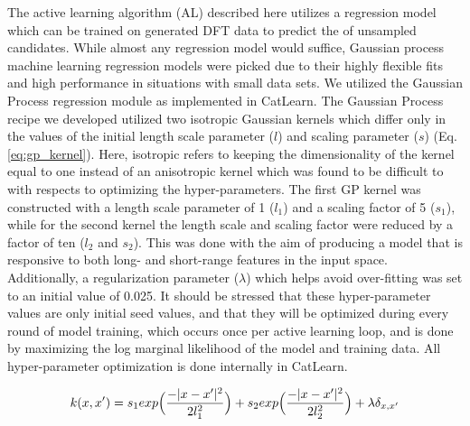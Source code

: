 %
The active learning algorithm (AL) described here utilizes a regression model which can be trained on generated DFT data to predict the \DHf of unsampled candidates.
%
While almost any regression model would suffice, Gaussian process machine learning regression models were picked due to their highly flexible fits and high performance in situations with small data sets.
%
We utilized the Gaussian Process regression module as implemented in CatLearn.\cite{hansen2019atomistic}
%
The Gaussian Process recipe we developed utilized two isotropic Gaussian kernels which differ only in the values of the initial length scale parameter ($l$) and scaling parameter ($s$) (Eq. \ref{eq:gp_kernel}).
%
Here, isotropic refers to keeping the dimensionality of the kernel equal to one instead of an anisotropic kernel which was found to be difficult to with respects to optimizing the hyper-parameters.
%
The first GP kernel was constructed with a length scale parameter of \num{1} ($l_1$) and a scaling factor of 5 ($s_1$),
while for the second kernel the length scale and scaling factor were reduced by a factor of ten ($l_2$ and $s_2$).
%
This was done with the aim of producing a model that is responsive to both long- and short-range features in the input space.
%
Additionally, a regularization parameter ($\lambda$) which helps avoid over-fitting was set to an initial value of \num{0.025}.
%
It should be stressed that these hyper-parameter values are only initial seed values, and that they will be optimized during every round of model training,
which occurs once per active learning loop,
and is done by maximizing the log marginal likelihood of the model and training data.
%
All hyper-parameter optimization is done internally in CatLearn.


\begin{equation}
    k(x,x') =
    s_1 exp \Bigl ( \frac{-|x-x'|^2}{2l_1^2}\Bigr) +
    s_2 exp\Bigl (\frac{-|x-x'|^2}{2l_2^2}\Bigr) +
    \lambda \delta_{x,x'}
    \label{eq:gp_kernel}
\end{equation}










